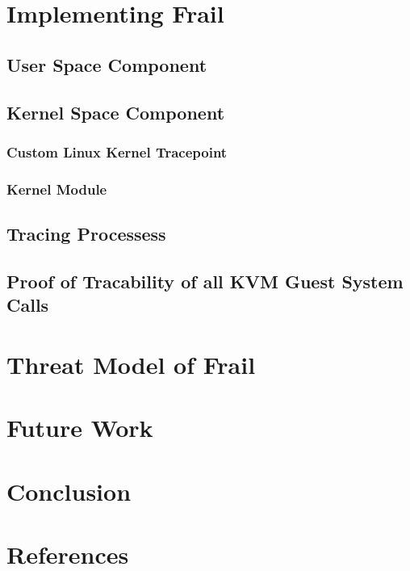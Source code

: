 \documentclass{report}
\begin{document}
\begin{spacing}{1.5}
\chapter{Implementing Frail}

\section{User Space Component}
\section{Kernel Space Component}
\subsection{Custom Linux Kernel Tracepoint}
\subsection{Kernel Module}
\section{Tracing Processess}
\section{Proof of Tracability of all KVM Guest System Calls}

\chapter{Threat Model of Frail}


\chapter{Future Work}

\chapter{Conclusion}

\chapter{References}

\end{spacing}
\end{document}
